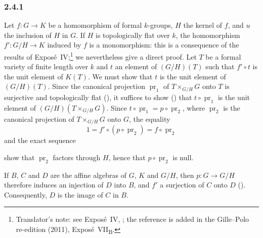 
\subsubsection*{2.4.1}
\label{sga3:VIIB:2.4.1}

Let \(f:G\to K\) be a homomorphism of formal \(k\)-groups, \(H\) the
kernel of \(f\), and \(u\) the inclusion of \(H\) in \(G\). If \(H\) is
topologically flat over \(k\), the homomorphism \(f':G/H\to K\) induced
by \(f\) is a monomorphism: this is a consequence of the results of
Exposé~IV;\footnote{Translator's note: see Exposé~IV,
; the reference is added in the Gille--Polo re-edition
(2011), Exposé~VII\textsubscript{B}.} we nevertheless give a direct proof. Let \(T\) be a formal
variety of finite length over \(k\) and \(t\) an element of
\((G/H)(T)\) such that \(f'\circ t\) is the unit element of \(K(T)\).
We must show that \(t\) is the unit element of \((G/H)(T)\). Since the
canonical projection \(\operatorname{pr}_1\) of \(T\times_{G/H}G\) onto
\(T\) is surjective and topologically flat \textup{()}, it
suffices to show \textup{()} that \(t\circ\operatorname{pr}_1\) is
the unit element of \((G/H)(T\times_{G/H}G)\). Since
\(t\circ\operatorname{pr}_1=p\circ\operatorname{pr}_2\), where
\(\operatorname{pr}_2\) is the canonical projection of
\(T\times_{G/H}G\) onto \(G\), the equality
\[
  1=f'\circ(p\circ\operatorname{pr}_2)=f\circ\operatorname{pr}_2
\]
and the exact sequence
\begin{center}
  \label{sga3:VIIB:2.4.1:exact-sequence}
  
\end{center}
show that \(\operatorname{pr}_2\) factors through \(H\), hence that
\(p\circ\operatorname{pr}_2\) is null.

\label{sga3:VIIB:2.4.1:corollary}%
If \(B\), \(C\) and \(D\) are the affine algebras of \(G\), \(K\) and
\(G/H\), then \(p:G\to G/H\) therefore induces an injection of \(D\)
into \(B\), and \(f'\) a surjection of \(C\) onto \(D\)
\textup{()}. Consequently, \(D\) is the image of \(C\) in \(B\).
